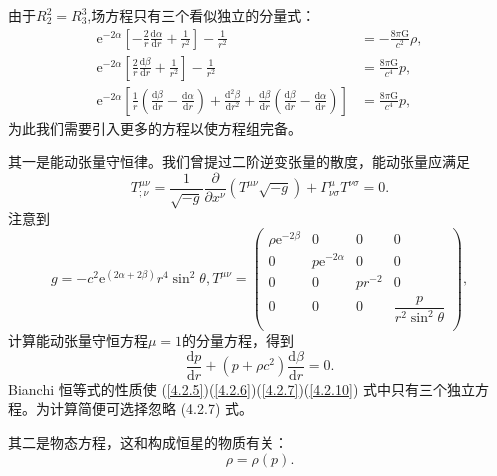 \documentclass[11pt, a4paper, oneside, onecolumn]{ctexart}
\numberwithin{equation}{subsection}
\begin{document}
由于$R^{2}_{2}=R^{3}_{3}$,场方程只有三个看似独立的分量式：
\begin{align}
\mathrm{e}^{-2\alpha}\left[-\frac{2}{r}\frac{\mathrm{d}\alpha}{\mathrm{d}r}+\frac{1}{r^{2}}\right]-\frac{1}{r^{2}}&=-\frac{8\pi\mathrm{G}}{c^{2}}\rho,\label{4.2.5}\\
\mathrm{e}^{-2\alpha}\left[\frac{2}{r}\frac{\mathrm{d}\beta}{\mathrm{d}r}+\frac{1}{r^{2}}\right]-\frac{1}{r^{2}}&=\frac{8\pi\mathrm{G}}{c^{4}}p,\label{4.2.6}\\
\mathrm{e}^{-2\alpha}\left[\frac{1}{r}\left(\frac{\mathrm{d}\beta}{\mathrm{d}r}-\frac{\mathrm{d}\alpha}{\mathrm{d}r}\right)+\frac{\mathrm{d}^{2}\beta}{\mathrm{d}r^{2}}+\frac{\mathrm{d}\beta}{\mathrm{d}r}\left(\frac{\mathrm{d}\beta}{\mathrm{d}r}-\frac{\mathrm{d}\alpha}{\mathrm{d}r}\right)\right]&=\frac{8\pi\mathrm{G}}{c^{4}}p,\label{4.2.7}
\end{align}
为此我们需要引入更多的方程以使方程组完备。

其一是能动张量守恒律。我们曾提过二阶逆变张量的散度，能动张量应满足
\begin{equation}
T^{\mu\nu}_{;\nu}=\frac{1}{\sqrt{-g}}\frac{\partial{}}{\partial{}x^{\nu}}\left(T^{\mu\nu}\sqrt{-g}\right)+\Gamma^{\mu}_{\nu\sigma}T^{\nu\sigma}=0.
\end{equation}
注意到
\begin{equation}
g=-c^{2}\mathrm{e}^{\left(2\alpha+2\beta\right)}r^{4}\sin^{2}\theta,T^{\mu\nu}=
\begin{pmatrix}
\rho \mathrm{e}^{-2\beta} & 0 & 0 & 0\\
0 & p\mathrm{e}^{-2\alpha} & 0 & 0\\
0 & 0 & pr^{-2} & 0\\
0 & 0 & 0 & \dfrac{p}{r^{2}\sin^{2}\theta}\\
\end{pmatrix},
\end{equation}
计算能动张量守恒方程$\mu=1$的分量方程，得到
\begin{equation}
\frac{\mathrm{d}p}{\mathrm{d}r}+\left(p+\rho c^{2}\right)\frac{\mathrm{d}\beta}{\mathrm{d}r}=0.\label{4.2.10}
\end{equation}
Bianchi 恒等式的性质使 (\ref{4.2.5})(\ref{4.2.6})(\ref{4.2.7})(\ref{4.2.10}) 式中只有三个独立方程。为计算简便可选择忽略 (4.2.7) 式。

其二是物态方程，这和构成恒星的物质有关：
\begin{equation}
\rho=\rho\left(p\right).
\end{equation}
\end{document}
